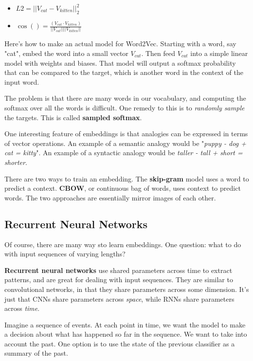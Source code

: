 \begin{itemize}
	\item $L2 = ||V_{cat} - V_{kitten}||_{2}^{2}$
	\item $\cos() = \frac{(V_{cat} \cdot V_{kitten})}{||V_{cat}|| ||V_{kitten}||}$
\end{itemize}

Here's how to make an actual model for Word2Vec. Starting with a word, say "cat", embed the word into a small vector $V_{cat}$. Then feed $V_{cat}$ into a simple linear model with weights and biases. That model will output a softmax probability that can be compared to the target, which is another word in the context of the input word. 

The problem is that there are many words in our vocabulary, and computing the softmax over all the words is difficult. One remedy to this is to \textit{randomly sample} the targets. This is called \textbf{sampled softmax}. 

One interesting feature of embeddings is that analogies can be expressed in terms of vector operations. An example of a semantic analogy would be "\textit{puppy - dog + cat = kitty}". An example of a syntactic analogy would be \textit{taller - tall + short = shorter}. 

There are two ways to train an embedding. The \textbf{skip-gram} model uses a word to predict a context. \textbf{CBOW}, or continuous bag of words, uses context to predict words. The two approaches are essentially mirror images of each other. 


\subsection{Recurrent Neural Networks} 

Of course, there are many way sto learn embeddings. One question: what to do with input sequences of varying lengths? 

\textbf{Recurrent neural networks} use shared parameters across time to extract patterns, and are great for dealing with input sequences. They are similar to convolutional networks, in that they share parameters across some dimension. It's just that CNNs share parameters across \textit{space}, while RNNs share parameters across \textit{time}. 

Imagine a sequence of events. At each point in time, we want the model to make a decision about what has happened so far in the sequence. We want to take into account the past. One option is to use the state of the previous classifier as a summary of the past.

